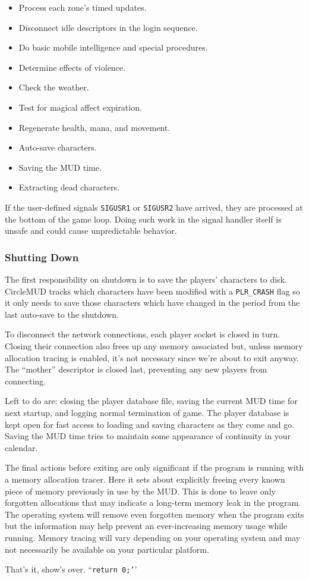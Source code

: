 \documentclass[11pt]{article}
\begin{document}
\begin{itemize}
\item Process each zone's timed updates.
\item Disconnect idle descriptors in the login sequence.
\item Do basic mobile intelligence and special procedures.
\item Determine effects of violence.
\item Check the weather.
\item Test for magical affect expiration.
\item Regenerate health, mana, and movement.
\item Auto-save characters.
\item Saving the MUD time.
\item Extracting dead characters.
\end{itemize}
If the user-defined signals \texttt{SIGUSR1} or \texttt{SIGUSR2} have arrived, they are processed at the bottom of the game loop.  Doing such work in the signal handler itself is unsafe and could cause unpredictable behavior.

\subsubsection{Shutting Down}
The first responsibility on shutdown is to save the players' characters to disk.  CircleMUD tracks which characters have been modified with a \texttt{PLR\_CRASH} flag so it only needs to save those characters which have changed in the period from the last auto-save to the shutdown.
\par
To disconnect the network connections, each player socket is closed in turn.  Closing their connection also frees up any memory associated but, unless memory allocation tracing is enabled, it's not necessary since we're about to exit anyway.  The ``mother'' descriptor is closed last, preventing any new players from connecting.
\par
Left to do are: closing the player database file, saving the current MUD time for next startup, and logging normal termination of game. The player database is kept open for fast access to loading and saving characters as they come and go.  Saving the MUD time tries to maintain some appearance of continuity in your calendar.
\par
The final actions before exiting are only significant if the program is running with a memory allocation tracer.  Here it sets about explicitly freeing every known piece of memory previously in use by the MUD.  This is done to leave only forgotten allocations that may indicate a long-term memory leak in the program.  The operating system will remove even forgotten memory when the program exits but the information may help prevent an ever-increasing memory usage while running. Memory tracing will vary depending on your operating system and may not necessarily be available on your particular platform.
\par
That's it, show's over. ``\texttt{return 0;'}'
\end{document}

